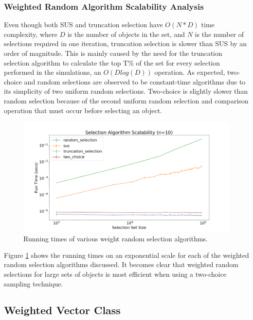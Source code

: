 \documentclass[12pt]{article}
\begin{document}
    \subsubsection{Weighted Random Algorithm Scalability Analysis}
    Even though both SUS and truncation selection have $O(N * D)$ time
    complexity, where $D$ is the number of objects in the set, and $N$ is the number of
    selections required in one iteration, truncation selection is slower than
    SUS by an order of magnitude. This is mainly caused by the need for the
    truncation selection algorithm to calculate the top T\% of the set for
    every selection performed in the simulations, an $O(Dlog(D))$ operation. As
    expected, two-choice and random selections are observed to be constant-time
    algorithms due to its simplicity of two uniform random selections.
    Two-choice is slightly slower than random selection because of the second
    uniform random selection and comparison operation that must occur before
    selecting an object.

    \begin{figure}[htbp]
      \centering
      \includegraphics[scale=0.28]{images/random_scalability.png} 
      \caption{Running times of various weight random selection algorithms.}
      \label{fig:random_scalability}
    \end{figure}

    \FloatBarrier

    Figure \ref{fig:random_scalability} shows the running times on an
    exponential scale for each of the weighted random selection algorithms
    discussed. It becomes clear that weighted random selections for large sets
    of objects is most efficient when using a two-choice sampling technique.

  \subsection{Weighted Vector Class}
\end{document}

